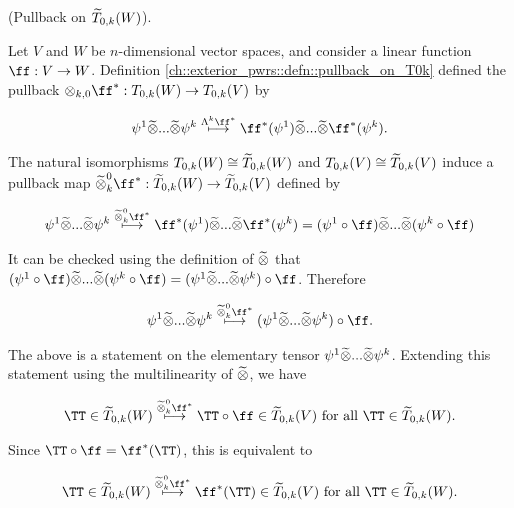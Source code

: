 \begin{deriv}
\label{ch::exterior_pwrs::deriv::pullback_on_tT0k}
    (Pullback on $\widetilde{T}_{0,k}(W)$).
    
    Let $V$ and $W$ be $n$-dimensional vector spaces, and consider a linear function $\ff:V \rightarrow W$. Definition \ref{ch::exterior_pwrs::defn::pullback_on_T0k} defined the pullback $\otimes_{k, 0} \ff^*: T_{0,k}(W) \rightarrow T_{0,k}(V)$ by
    
    \begin{align*}
        \psi^1 \totimes ... \totimes \psi^k \overset{\Lambda^k \ff^*}{\longmapsto} \ff^*(\psi^1) \totimes ... \totimes \ff^*(\psi^k).
    \end{align*}
    
    The natural isomorphisms $T_{0,k}(W) \cong \widetilde{T}_{0,k}(W)$ and $T_{0,k}(V) \cong \widetilde{T}_{0,k}(V)$ induce a pullback map ${\totimes^0_k \ff^*:\tT_{0,k}(W) \rightarrow \tT_{0,k}(V)}$ defined by
    
    \begin{align*}
        \psi^1 \totimes ... \totimes \psi^k \overset{\totimes^0_k \ff^*}{\longmapsto} \ff^*(\psi^1) \totimes ... \totimes \ff^*(\psi^k) = (\psi^1 \circ \ff) \totimes ... \totimes (\psi^k \circ \ff)
    \end{align*}
    
    It can be checked using the definition of $\widetilde{\otimes}$ that $(\psi^1 \circ \ff) \totimes ... \totimes (\psi^k \circ \ff) = (\psi^1 \totimes ... \totimes \psi^k) \circ \ff$. Therefore
    
    \begin{align*}
        \psi^1 \totimes ... \totimes \psi^k \overset{\totimes^0_k \ff^*}{\longmapsto}
        (\psi^1 \totimes ... \totimes \psi^k) \circ \ff.
    \end{align*}
    
    The above is a statement on the elementary tensor $\psi^1 \widetilde{\otimes} ... \widetilde{\otimes} \psi^k$. Extending this statement using the multilinearity of $\widetilde{\otimes}$, we have
    
    \begin{align*}
        \TT \in \tT_{0,k}(W) \overset{\totimes^0_k \ff^*}{\longmapsto} \TT \circ \ff \in \tT_{0,k}(V) \text{ for all $\TT \in \tT_{0,k}(W)$}.
    \end{align*}
    
    Since $\TT \circ \ff = \ff^*(\TT)$, this is equivalent to
    
    \begin{align*}
        \TT \in \tT_{0,k}(W) \overset{\totimes^0_k \ff^*}{\longmapsto} \ff^*(\TT) \in \tT_{0,k}(V) \text{ for all $\TT \in \tT_{0,k}(W)$}.
    \end{align*}
    

\end{deriv}
